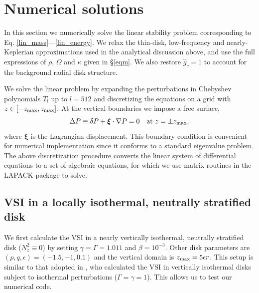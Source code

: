 \section{Numerical solutions}\label{numerical}
In this section we numerically solve the linear stability problem
corresponding to Eq. \ref{lin_mass}---\ref{lin_energy}. 
We relax the thin-disk, low-frequency and nearly-Keplerian
approximations used in the analytical discussion above, and  
use the full expressions of $\rho$, $\Omega$ and
$\kappa$ given in \S\ref{eqm}. We also restore $\hat{g}_c=1$ to
account for the background radial disk structure.  


We solve the linear problem by expanding the
perturbations in Chebyshev polynomials $T_l$ up to $l=512$
and discretizing the equations on a grid with
$z\in[-z_\mathrm{max},z_\mathrm{max}]$. At the vertical boundaries we impose a free
surface, 
\begin{align}
  \Delta P \equiv \delta P + \bm{\xi}\cdot\nabla P= 0 \quad \text{at } z=\pm z_\mathrm{max},
\end{align}
where $\bm{\xi}$ is the Lagrangian displacement. This boundary
condition is convenient for numerical implementation since it conforms
to a standard eigenvalue problem. The above discretization procedure
converts the linear system of differential equations to a set of 
algebraic equations, for which we use matrix routines in the LAPACK
package to solve. 


\subsection{VSI in a locally isothermal, neutrally stratified disk}\label{vertiso_pertiso} 
We first calculate the VSI in a nearly vertically isothermal, neutrally
stratified disk ($N_z^2\equiv0$) by setting
$\gamma=\Gamma=1.011$ and $\beta=10^{-3}$. Other disk parameters are 
$(p,q,\epsilon)=(-1.5,-1,0.1)$ and the vertical domain is $z_\mathrm{max} =
5\epsilon r$. This setup is similar to that adopted in
\cite{mcnally14}, who calculated the VSI in vertically isothermal
disks subject to isothermal perturbations ($\Gamma=\gamma=1$).  This
allows us to test our numerical code.  

